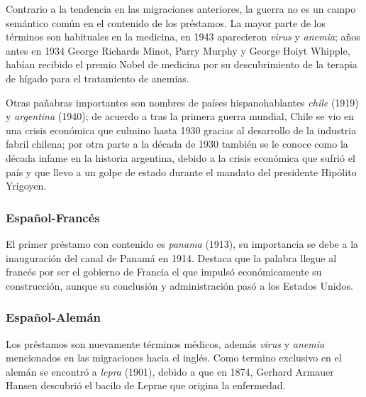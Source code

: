 Contrario a la tendencia en las migraciones anteriores, la guerra no es un campo semántico común en el contenido de los préstamos. La mayor parte de los términos son habituales en la medicina,  en 1943  aparecieron  \textit{virus} y \textit{anemia};  años antes en 1934 George Richards Minot, Parry Murphy y George Hoiyt Whipple, habían recibido el premio Nobel de medicina por su descubrimiento de la terapia de hígado para el tratamiento de anemias.   

Otras pañabras importantes son nombres de países hispanohablantes \textit{chile} (1919) y \textit{argentina} (1940); de acuerdo a \cite{crisis_chile} tras la primera guerra mundial, Chile se vio en una crisis económica  que culmino hasta 1930 gracias al desarrollo de la industria fabril chilena; por otra parte a la década de 1930 también se le conoce como la década infame en la historia argentina, debido a la crisis económica que sufrió el país  y que llevo a un golpe de estado durante el mandato del presidente Hipólito Yrigoyen. 

\subsubsection*{Español-Francés}%

El primer préstamo con contenido es \textit{panama} (1913), su importancia se debe a la inauguración del canal de Panamá en 1914. Destaca que la palabra llegue al francés por ser el gobierno de Francia el que impulsó económicamente su construcción, aunque su conclusión y administración pasó a los Estados Unidos.  




\subsubsection*{Español-Alemán}


Los préstamos son nuevamente términos médicos, además \textit{virus} y \textit{anemia} mencionados en las migraciones hacia el inglés. Como termino exclusivo en el alemán  se encontró a \textit{lepra} (1901), debido a que en 1874, Gerhard Armauer Hansen descubrió el bacilo de Leprae que origina la enfermedad.



